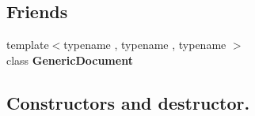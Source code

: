 \subsection*{Friends}
\begin{DoxyCompactItemize}
\item 
\hypertarget{class_generic_value_ab05bc9e52e201a2867ea5bac141ee1ae}{}{\footnotesize template$<$typename , typename , typename $>$ }\\class {\bfseries Generic\+Document}\label{class_generic_value_ab05bc9e52e201a2867ea5bac141ee1ae}

\end{DoxyCompactItemize}
\subsection*{Constructors and destructor.}
